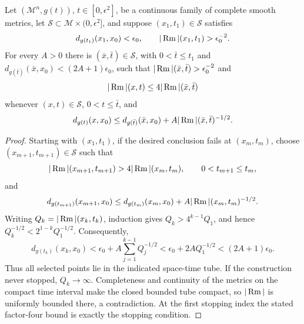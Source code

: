 \begin{proposition}
\label{prop:chow-iii-appj-solution-22-5}


Let \((\mathcal M^n,g(t))\), \(t\in[0,\epsilon^2]\), be a continuous family
of complete smooth metrics, let \(\mathcal S\subset\mathcal M\times
(0,\epsilon^2]\), and suppose \((x_1,t_1)\in\mathcal S\) satisfies
\[
 d_{g(t_1)}(x_1,x_0)<\epsilon_0,
 \qquad |\operatorname{Rm}|(x_1,t_1)>\epsilon_0^{-2}.
\]
For every \(A>0\) there is \((\bar x,\bar t)\in\mathcal S\), with
\(0<\bar t\leq t_1\) and
\(d_{g(\bar t)}(\bar x,x_0)<(2A+1)\epsilon_0\), such that
\(|\operatorname{Rm}|(\bar x,\bar t)>\epsilon_0^{-2}\) and
\[
 |\operatorname{Rm}|(x,t)\leq4|\operatorname{Rm}|(\bar x,\bar t)
\]
whenever \((x,t)\in\mathcal S\), \(0<t\leq\bar t\), and
\[
 d_{g(t)}(x,x_0)\leq d_{g(\bar t)}(\bar x,x_0)
     +A|\operatorname{Rm}|(\bar x,\bar t)^{-1/2}.
\]
\end{proposition}
\begin{proof}
\sketch
Starting with \((x_1,t_1)\), if the desired conclusion fails at
\((x_m,t_m)\), choose \((x_{m+1},t_{m+1})\in\mathcal S\) such that
\[
 |\operatorname{Rm}|(x_{m+1},t_{m+1})>4|\operatorname{Rm}|(x_m,t_m),
 \qquad 0<t_{m+1}\leq t_m,
\]
and
\[
 d_{g(t_{m+1})}(x_{m+1},x_0)
 \leq d_{g(t_m)}(x_m,x_0)+A|\operatorname{Rm}|(x_m,t_m)^{-1/2}.
\]
Writing \(Q_k=|\operatorname{Rm}|(x_k,t_k)\), induction gives
\(Q_k>4^{k-1}Q_1\), and hence
\(Q_k^{-1/2}<2^{1-k}Q_1^{-1/2}\).  Consequently,
\[
 d_{g(t_k)}(x_k,x_0)
 <\epsilon_0+A\sum_{j=1}^{k-1}Q_j^{-1/2}
 <\epsilon_0+2AQ_1^{-1/2}
 <(2A+1)\epsilon_0.
\]
Thus all selected points lie in the indicated space-time tube.  If the
construction never stopped, \(Q_k\to\infty\).  Completeness and continuity
of the metrics on the compact time interval make the closed bounded tube
compact, so \(|\operatorname{Rm}|\) is uniformly bounded there, a contradiction.  At the
first stopping index the stated factor-four bound is exactly the stopping
condition.
\end{proof}

